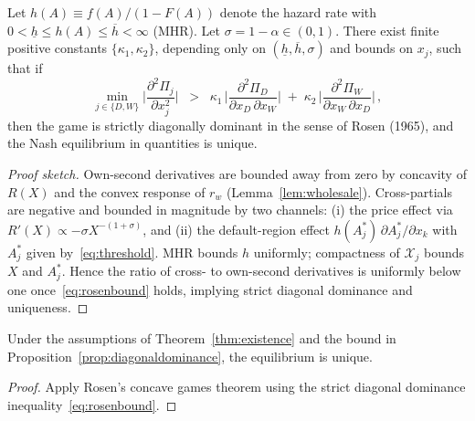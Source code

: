 \documentclass[12pt]{article}
\begin{document}
\begin{proposition}\label{prop:diagonaldominance}
Let $h(A)\equiv f(A)/(1-F(A))$ denote the hazard rate with $0<\underline h\le h(A)\le \overline h<\infty$ (MHR). Let $\sigma=1-\alpha\in(0,1)$. There exist finite positive constants $\{\kappa_1,\kappa_2\}$, depending only on $(\underline h,\overline h,\sigma)$ and bounds on $x_j$, such that if
\begin{equation}\label{eq:rosenbound}
\min_{j\in\{D,W\}}\Big|\frac{\partial^2 \Pi_j}{\partial x_j^2}\Big| 
\;\;>\;\; \kappa_1\,\Big|\frac{\partial^2 \Pi_D}{\partial x_D\,\partial x_W}\Big| 
\; +\; \kappa_2\,\Big|\frac{\partial^2 \Pi_W}{\partial x_W\,\partial x_D}\Big| \, ,
\end{equation}
then the game is strictly diagonally dominant in the sense of Rosen (1965), and the Nash equilibrium in quantities is unique.
\end{proposition}
\begin{proof}[Proof sketch]
Own-second derivatives are bounded away from zero by concavity of $R(X)$ and the convex response of $r_w$ (Lemma~\ref{lem:wholesale}). Cross-partials are negative and bounded in magnitude by two channels: (i) the price effect via $R'(X)\propto -\sigma X^{-(1+\sigma)}$, and (ii) the default-region effect $h(A_j^*)\,\partial A_j^*/\partial x_k$ with $A_j^*$ given by~\eqref{eq:threshold}. MHR bounds $h$ uniformly; compactness of $\mathcal X_j$ bounds $X$ and $A_j^*$. Hence the ratio of cross- to own-second derivatives is uniformly below one once~\eqref{eq:rosenbound} holds, implying strict diagonal dominance and uniqueness.
\end{proof}

\begin{theorem}[Uniqueness]\label{thm:uniqueness}
Under the assumptions of Theorem~\ref{thm:existence} and the bound in Proposition~\ref{prop:diagonaldominance}, the equilibrium is unique.
\end{theorem}
\begin{proof}
Apply Rosen's concave games theorem using the strict diagonal dominance inequality~\eqref{eq:rosenbound}.
\end{proof}

\end{document}
